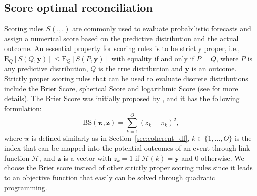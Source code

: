\documentclass[a4paper,review,11pt,authoryear]{elsarticle}
\newcommand{\bpi}{\bm{\pi}}
\theoremstyle{definition}
\begin{document}
    \subsection{Score optimal reconciliation}
    \label{sec:algorithm}

    Scoring rules $S(.,.)$ are commonly used to evaluate probabilistic forecasts and assign a numerical score based on the predictive distribution and the actual outcome.
    An essential property for scoring rules is to be strictly proper, i.e., $\text{E}_Q[S(Q, \mathbf{y})] \leq \text{E}_Q[S(P, \mathbf{y})]$ with equality if and only if $P=Q$, where $P$ is any predictive distribution, $Q$ is the true distribution and $\mathbf{y}$ is an outcome.
    Strictly proper scoring rules that can be used to evaluate discrete distributions include the Brier Score, spherical Score and logarithmic Score (see \citealp{gneitingStrictlyProperScoring2007} for more details).
    The Brier Score was initially proposed by \cite{brier1950verification}, and it has the following formulation:
    \[
      \text{BS}(\bpi, \mathbf{z}) = \sum_{k=1}^{O}(z_k - \pi_k)^2,
    \] where $\bpi$ is defined similarly as in Section~\ref{sec:coherent_df},
    $k\in \{1,\dots,O\}$ is the index that can be mapped into the potential outcomes of an event through link function $\mathcal{H}$, and $\mathbf{z}$ is a vector with $z_k = 1$ if $\mathcal{H}(k) = \mathbf{y}$ and $0$ otherwise.
    We choose the Brier score instead of other strictly proper scoring rules since it leads to an objective function that easily can be solved through quadratic programming.
\end{document}
